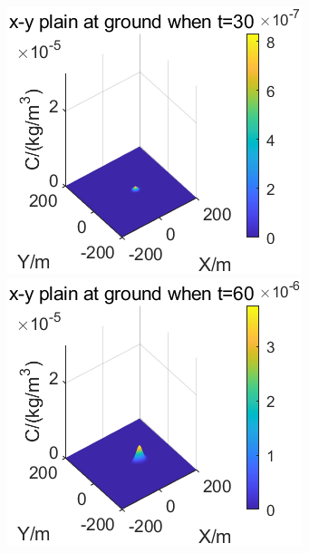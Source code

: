 \documentclass{article}
\begin{document}
	\begin{figure}[htbp]
		\begin{minipage}{0.33\textwidth}
			\includegraphics[width=\textwidth]{pics/v=1,t=30.png}
		\end{minipage}
		\begin{minipage}{0.33\textwidth}
			\includegraphics[width=\textwidth]{pics/v=1,t=60.png}
		\end{minipage}

\end{figure}
\end{document}
